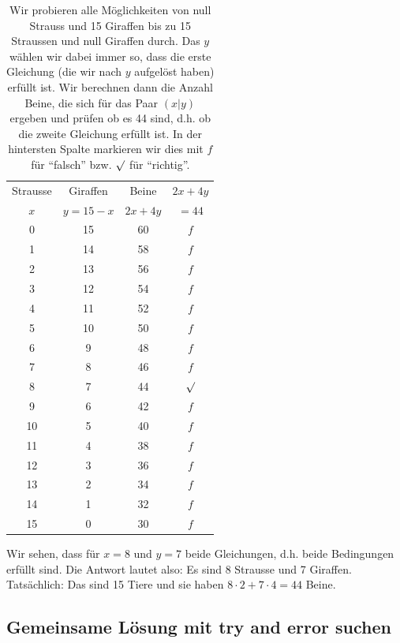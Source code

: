 \documentclass[%
11pt,%
twoside,%
titlepage,%
german,%
]{scrartcl}
\newcommand{\begriff}[1]{``#1''}
\begin{document}
\begin{table}[b!]
  \centering
  \begin{tabular}{|c|c|c|c|}
    \hline
    Strausse & Giraffen & Beine & $2x+4y$ \\
    $x$ & $y=15-x$ & $2x+4y$ & $=44$ \\ \hline\hline
    0 & 15 & 60 & $f$ \\ \hline
    1 & 14 & 58 & $f$ \\ \hline
    2 & 13 & 56 & $f$ \\ \hline
    3 & 12 & 54 & $f$ \\ \hline
    4 & 11 & 52 & $f$ \\ \hline
    5 & 10 & 50 & $f$ \\ \hline
    6 & 9 & 48 & $f$ \\ \hline
    7 & 8 & 46 & $f$ \\ \hline
    8 & 7 & 44 & $\surd$ \\ \hline
    9 & 6 & 42 & $f$ \\ \hline
    10 & 5 & 40 & $f$ \\ \hline
    11 & 4 & 38 & $f$ \\ \hline
    12 & 3 & 36 & $f$ \\ \hline
    13 & 2 & 34 & $f$ \\ \hline
    14 & 1 & 32 & $f$ \\ \hline
    15 & 0 & 30 & $f$ \\ \hline
  \end{tabular}
  \caption{Wir probieren alle M\"oglichkeiten von null Strauss und 15 Giraffen bis zu 15 Straussen und null Giraffen durch. Das $y$ w\"ahlen wir dabei immer so, dass die erste Gleichung (die wir nach $y$ aufgel\"ost haben) erf\"ullt ist. Wir berechnen dann die Anzahl Beine, die sich f\"ur das Paar $(x|y)$ ergeben und pr\"ufen ob es 44 sind, d.h. ob die zweite Gleichung erf\"ullt ist. In der hintersten Spalte markieren wir dies mit $f$ f\"ur \begriff{falsch} bzw. $\surd$ f\"ur \begriff{richtig}.}
  \label{tab:linglsyst:erste}
\end{table}

Wir sehen, dass f\"ur $x=8$ und $y=7$ beide Gleichungen, d.h. beide Bedingungen erf\"ullt sind. Die Antwort lautet also: Es sind 8 Strausse und 7 Giraffen. Tats\"achlich: Das sind 15 Tiere und sie haben $8 \cdot 2 + 7 \cdot 4 = 44$ Beine.

\subsection{Gemeinsame L\"osung mit try and error suchen}
\label{linglsyst:heraussuchen}
\end{document}
